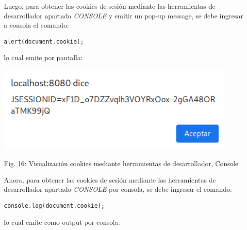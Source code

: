 \documentclass[12pt,oneside,a4paper]{book}
\begin{document}
\begin{enumerate}
\begin{enumerate}
        \vspace{2em}

        \hspace{20pt}
        Luego, para obtener las cookies de sesión mediante las herramientas de desarrollador apartado \textit{CONSOLE} y emitir un pop-up message, se debe ingresar a consola el comando:
        
        \vspace{1em}

        \begin{verbatim}
alert(document.cookie);
        \end{verbatim}

        lo cual emite por pantalla:

        \vspace{2em}

        \begin{center}
            \includegraphics[width=12cm]{img/xss2.png}
            
            \vspace{0.1em}
            
            Fig. 16: Visualización cookies mediante herramientas de desarrollador, Console
        \end{center}
        
        \newpage

        \hspace{20pt}
        Ahora, para obtener las cookies de sesión mediante las herramientas de desarrollador apartado \textit{CONSOLE} por consola, se debe ingresar el comando:
        
        \vspace{1em}

        \begin{verbatim}
console.log(document.cookie);
        \end{verbatim}

        lo cual emite como output por consola:

        \vspace{2em}


\end{enumerate}
\end{enumerate}
\end{document}
